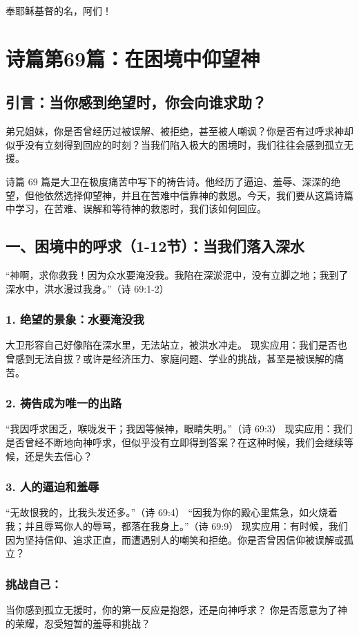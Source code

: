 \documentclass[a4paper, 12pt]{article}
\begin{document}
奉耶稣基督的名，阿们！
\newpage
\section{诗篇第69篇：在困境中仰望神}
\subsection*{引言：当你感到绝望时，你会向谁求助？}
\hspace{0.6cm}弟兄姐妹，你是否曾经历过被误解、被拒绝，甚至被人嘲讽？你是否有过呼求神却似乎没有立刻得到回应的时刻？当我们陷入极大的困境时，我们往往会感到孤立无援。

诗篇 69 篇是大卫在极度痛苦中写下的祷告诗。他经历了逼迫、羞辱、深深的绝望，但他依然选择仰望神，并且在苦难中信靠神的救恩。今天，我们要从这篇诗篇中学习，在苦难、误解和等待神的救恩时，我们该如何回应。

\subsection*{一、困境中的呼求（1-12节）：当我们落入深水}
“神啊，求你救我！因为众水要淹没我。我陷在深淤泥中，没有立脚之地；我到了深水中，洪水漫过我身。”（诗 69:1-2）

\subsubsection*{1. 绝望的景象：水要淹没我}
大卫形容自己好像陷在深水里，无法站立，被洪水冲走。
现实应用：我们是否也曾感到无法自拔？或许是经济压力、家庭问题、学业的挑战，甚至是被误解的痛苦。
\subsubsection*{2. 祷告成为唯一的出路}
“我因呼求困乏，喉咙发干；我因等候神，眼睛失明。”（诗 69:3）
现实应用：我们是否曾经不断地向神呼求，但似乎没有立即得到答案？在这种时候，我们会继续等候，还是失去信心？
\subsubsection*{3. 人的逼迫和羞辱}
“无故恨我的，比我头发还多。”（诗 69:4）
“因我为你的殿心里焦急，如火烧着我；并且辱骂你人的辱骂，都落在我身上。”（诗 69:9）
现实应用：有时候，我们因为坚持信仰、追求正直，而遭遇别人的嘲笑和拒绝。你是否曾因信仰被误解或孤立？
\subsubsection*{挑战自己：}
当你感到孤立无援时，你的第一反应是抱怨，还是向神呼求？
你是否愿意为了神的荣耀，忍受短暂的羞辱和挑战？
\end{document}
